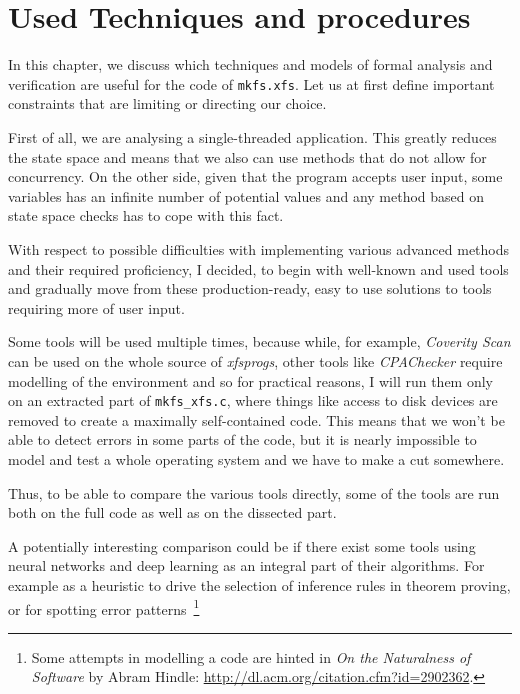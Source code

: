 
\chapter{Used Techniques and procedures}\label{chap:techniques}

In this chapter, we discuss which techniques and models of formal analysis and verification are useful for the code of {\tt mkfs.xfs}. Let us at first define important constraints that are limiting or directing our choice.

First of all, we are analysing a single-threaded application. This greatly reduces the state space and means that we also can use methods that do not allow for concurrency. On the other side, given that the program accepts user input, some variables has an infinite number of potential values and any method based on state space checks has to cope with this fact.

With respect to possible difficulties with implementing various advanced methods and their required proficiency, I decided, to begin with well-known and used tools and gradually move from these production-ready, easy to use solutions to tools requiring more of user input.

Some tools will be used multiple times, because while, for example, {\em Coverity Scan} can be used on the whole source of {\em xfsprogs}, other tools like {\em CPAChecker} require modelling of the environment and so for practical reasons, I will run them only on an extracted part of {\tt mkfs\_xfs.c}, where things like access to disk devices are removed to create a maximally self-contained code. This means that we won't be able to detect errors in some parts of the code, but it is nearly impossible to model and test a whole operating system and we have to make a cut somewhere. 

Thus, to be able to compare the various tools directly, some of the tools are run both on the full code as well as on the dissected part.

A potentially interesting comparison could be if there exist some tools using neural networks and deep learning as an integral part of their algorithms. For example as a heuristic to drive the selection of inference rules in theorem proving, or for spotting error patterns~\footnote{Some attempts in modelling a code are hinted in {\em On the Naturalness of Software} by Abram Hindle: \url{http://dl.acm.org/citation.cfm?id=2902362}.}

